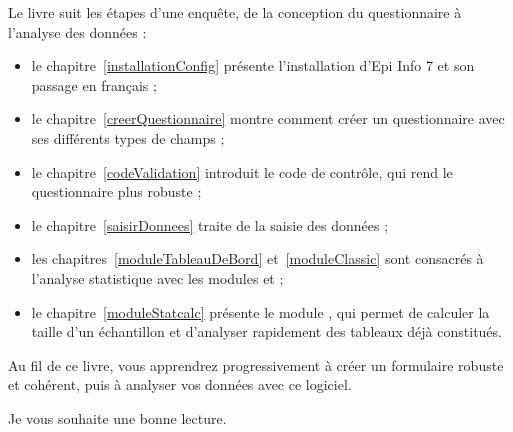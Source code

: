 Le livre suit les étapes d'une enquête, de la conception du questionnaire à l'analyse des données :
\begin{itemize}
	\item le chapitre~\ref{installationConfig} présente l'installation d'Epi Info 7 et son passage en français ;
	\item le chapitre~\ref{creerQuestionnaire} montre comment créer un questionnaire avec ses différents types de champs ;
	\item le chapitre~\ref{codeValidation} introduit le code de contrôle, qui rend le questionnaire plus robuste ;
	\item le chapitre~\ref{saisirDonnees} traite de la saisie des données ;
	\item les chapitres~\ref{moduleTableauDeBord} et~\ref{moduleClassic} sont consacrés à l'analyse statistique avec les modules  et  ;
	\item le chapitre~\ref{moduleStatcalc} présente le module , qui permet de calculer la taille d'un échantillon et d'analyser rapidement des tableaux déjà constitués.
\end{itemize}

Au fil de ce livre, vous apprendrez progressivement à créer un formulaire robuste et cohérent, puis à analyser vos données avec ce logiciel.

Je vous souhaite une bonne lecture.
